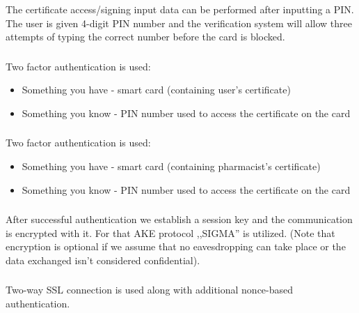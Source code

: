 \subsubsection{}

The certificate access/signing input data can be performed after inputting a PIN. The user is given 4-digit PIN number and the verification system will allow three attempts of typing the correct number before the card is blocked.

\subsubsection{}

Two factor authentication is used:
\begin{itemize}
 \item Something you have - smart card (containing user's certificate)
 \item Something you know - PIN number used to access the certificate on the card
\end{itemize}

\subsubsection{}

Two factor authentication is used:
\begin{itemize}
 \item Something you have - smart card (containing pharmacist's certificate)
 \item Something you know - PIN number used to access the certificate on the card
\end{itemize}

\subsubsection{}
After successful authentication we establish a session key and the communication is encrypted with it. For that AKE protocol ,,SIGMA'' is utilized. (Note that encryption is optional if we assume that no eavesdropping can take place or the data exchanged isn't considered confidential).

\subsubsection{}
Two-way SSL connection is used along with additional nonce-based authentication.

